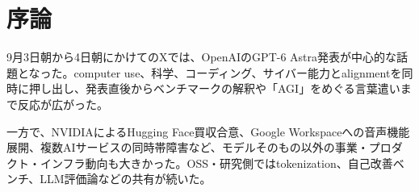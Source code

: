 \section{序論}

9月3日朝から4日朝にかけてのXでは、OpenAIのGPT-6 Astra発表が中心的な話題となった。computer use、科学、コーディング、サイバー能力とalignmentを同時に押し出し、発表直後からベンチマークの解釈や「AGI」をめぐる言葉遣いまで反応が広がった。

一方で、NVIDIAによるHugging Face買収合意、Google Workspaceへの音声機能展開、複数AIサービスの同時帯障害など、モデルそのもの以外の事業・プロダクト・インフラ動向も大きかった。OSS・研究側ではtokenization、自己改善ベンチ、LLM評価論などの共有が続いた。

